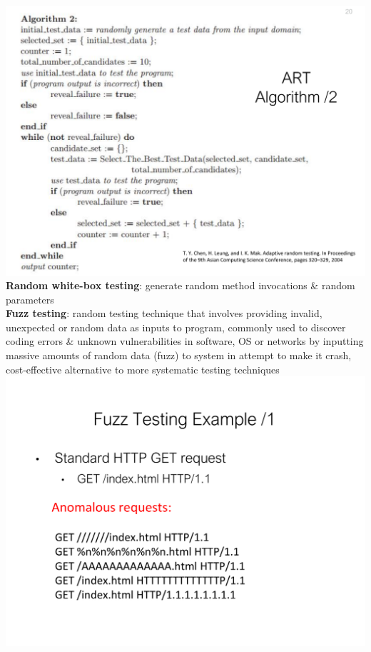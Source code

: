 \documentclass[a4paper]{article}
\begin{document}
\begin{multicols}{3}
        \includegraphics[width=\linewidth]{269.pdf}\\
        \textbf{Random white-box testing}: generate random method invocations \& random parameters\\
        \textbf{Fuzz testing}: random testing technique that involves providing invalid, unexpected or random data as inputs to program, commonly used to discover coding errors \& unknown vulnerabilities in software, OS or networks by inputting massive amounts of random data (fuzz) to system in attempt to make it crash, cost-effective alternative to more systematic testing techniques\\
        \includegraphics[width=\linewidth]{272.pdf}\\

\end{multicols}
\end{document}
